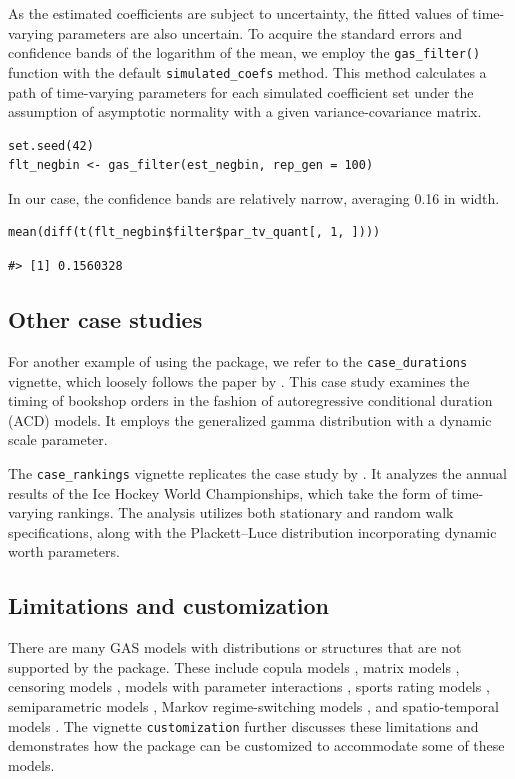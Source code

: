 As the estimated coefficients are subject to uncertainty, the fitted values of time-varying parameters are also uncertain. To acquire the standard errors and confidence bands of the logarithm of the mean, we employ the \texttt{gas\_filter()} function with the default \texttt{simulated\_coefs} method. This method calculates a path of time-varying parameters for each simulated coefficient set under the assumption of asymptotic normality with a given variance-covariance matrix.

\begin{verbatim}
set.seed(42)
flt_negbin <- gas_filter(est_negbin, rep_gen = 100)
\end{verbatim}

In our case, the confidence bands are relatively narrow, averaging 0.16 in width.

\begin{verbatim}
mean(diff(t(flt_negbin$filter$par_tv_quant[, 1, ])))
\end{verbatim}

\begin{verbatim}
#> [1] 0.1560328
\end{verbatim}

\subsection{Other case studies}\label{other-case-studies}

For another example of using the package, we refer to the \texttt{case\_durations} vignette, which loosely follows the paper by \citet{Tomanova2021}. This case study examines the timing of bookshop orders in the fashion of autoregressive conditional duration (ACD) models. It employs the generalized gamma distribution with a dynamic scale parameter.

The \texttt{case\_rankings} vignette replicates the case study by \citet{Holy2022f}. It analyzes the annual results of the Ice Hockey World Championships, which take the form of time-varying rankings. The analysis utilizes both stationary and random walk specifications, along with the Plackett--Luce distribution incorporating dynamic worth parameters.

\subsection{Limitations and customization}\label{limitations-and-customization}

There are many GAS models with distributions or structures that are not supported by the  package. These include copula models \citep{DeLiraSalvatierra2015}, matrix models \citep{Opschoor2018}, censoring models \citep{Harvey2023}, models with parameter interactions \citep{Holy2022b}, sports rating models \citep{Gorgi2019}, semiparametric models \citep{Blasques2016b}, Markov regime-switching models \citep{Bazzi2017}, and spatio-temporal models \citep{Catania2017}. The vignette \texttt{customization} further discusses these limitations and demonstrates how the package can be customized to accommodate some of these models.


